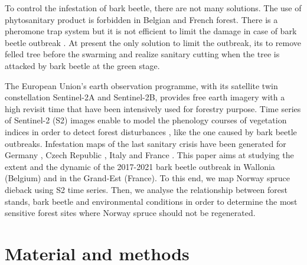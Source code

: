 \documentclass[3p,procedia]{elsarticle}
\begin{document}
To control the infestation of bark beetle, there are not many solutions. 
The use of phytosanitary product is forbidden in Belgian and French forest.
There is a pheromone trap system but it is not efficient to limit the damage in case of bark beetle outbreak \citep{kuhn_pheromone_2022}.
At present the only solution to limit the outbreak, its to remove felled tree before the swarming and realize sanitary cutting when the tree is attacked by bark beetle at the green stage.

The European Union’s earth observation programme, with its satellite twin constellation Sentinel-2A and Sentinel-2B, provides free earth imagery with a high revisit time that have been intensively used for forestry purpose. 
Time series of Sentinel-2 (S2) images enable to model the phenology courses of vegetation indices in order to detect forest disturbances \citep{low_phenology_2020}, like the one caused by bark beetle outbreaks.
Infestation maps of the last sanitary crisis have been generated for Germany \citep{ali_canopy_2021,thonfeld_first_2022}, Czech Republic \citep{barta_early_2021}, Italy \citep{dalponte_mapping_2022} and France \citep{nardi_drought_2022}. 
This paper aims at studying the extent and the dynamic of the 2017-2021 bark beetle outbreak in Wallonia (Belgium) and in the Grand-Est (France).
To this end, we map Norway spruce dieback using S2 time series.
Then, we analyse the relationship between forest stands, bark beetle and environmental conditions in order to determine the most sensitive forest sites where Norway spruce should not be regenerated.


\section{Material and methods}
\end{document}
